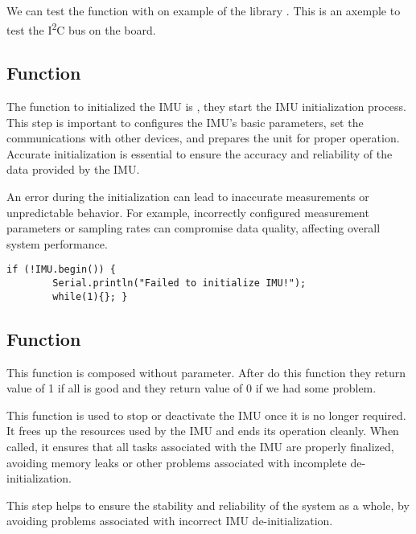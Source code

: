 We can test the function with on example of the library . This is an axemple to test the I\textsuperscript{2}C bus on the board. 
\begin{center}
    
    \label{TestWire}
    
\end{center}
\subsection{Function }


The function to initialized the IMU is , they start the IMU initialization process. This step is important to configures the IMU's basic parameters, set the communications with other devices, and prepares the unit for proper operation. Accurate initialization is essential to ensure the accuracy and reliability of the data provided by the IMU.

An error during the initialization can lead to inaccurate measurements or unpredictable behavior. For example, incorrectly configured measurement parameters or sampling rates can compromise data quality, affecting overall system performance.


\begin{lstlisting}[style= Arduino]
    if (!IMU.begin()) {
        Serial.println("Failed to initialize IMU!");
        while(1){};	}
\end{lstlisting}


\subsection{Function } 

This function is composed without parameter. After do this function they return value of 1 if all is good and they return value of 0 if we had some problem.

This function is used to stop or deactivate the IMU once it is no longer required. It frees up the resources used by the IMU and ends its operation cleanly. When called, it ensures that all tasks associated with the IMU are properly finalized, avoiding memory leaks or other problems associated with incomplete de-initialization.

This step helps to ensure the stability and reliability of the system as a whole, by avoiding problems associated with incorrect IMU de-initialization.

